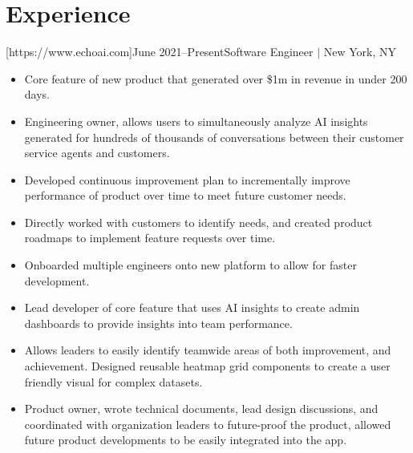 \documentclass[letterpaper,11pt]{article}
\newcommand{\Item}[1]{
  \item\small{
    \parbox[t]{500pt}{\raggedright#1}
  }
}
\newenvironment{HeadingList}{
  \begin{mdframed}[
    topline=false,
    bottomline=false,
    rightline=false,
    leftline=false,
    linecolor=gray,
    linewidth=0pt,
    leftmargin=0pt,
    innerleftmargin=0pt,
    innertopmargin=0pt,
    innerbottommargin=0pt,
    innerrightmargin=0pt,
    skipabove=\parsep,
    skipbelow=\parsep,
  ]
  \begin{itemize}[leftmargin=0pt, label={}]
}{
  \end{itemize}
  \end{mdframed}
}
\newenvironment{SubHeadingList}{
  \begin{mdframed}[
    leftline=true,
    linecolor=gray,
    linewidth=.5pt,
    leftmargin=8pt,
    innerleftmargin=8pt,
  ]
  \begin{itemize}[leftmargin=0pt, label={}]
}{
  \end{itemize}
  \end{mdframed}
}
\newenvironment{ItemList}{
  \begin{itemize}[itemsep=4pt, topsep=-3pt, partopsep=0pt, parsep=0pt, leftmargin=20pt, label=\raisebox{0.4ex}{\scalebox{0.5}{\textbullet}}]
}{\end{itemize}}
\begin{document}



\section{Experience}
    \begin{HeadingList}
        [https://www.echoai.com]{June 2021--Present}{Software Engineer $|$ New York, NY}
            \begin{SubHeadingList}

                \begin{ItemList}
                    \Item{Core feature of new product that generated over \$1m in revenue in under 200 days.}
                    \Item{Engineering owner, allows users to simultaneously analyze AI insights generated for hundreds of thousands of conversations between their customer service agents and customers.}
                    \Item{Developed continuous improvement plan to incrementally improve performance of product over time to meet future customer needs.}
                    \Item{Directly worked with customers to identify needs, and created product roadmaps to implement feature requests over time.}
                    \Item{Onboarded multiple engineers onto new platform to allow for faster development.}
                \end{ItemList}

                \begin{ItemList}
                    \Item{Lead developer of core feature that uses AI insights to create admin dashboards to provide insights into team performance.}
                    \Item{Allows leaders to easily identify teamwide areas of both improvement, and achievement. Designed reusable heatmap grid components to create a user friendly visual for complex datasets.}
                    \Item{Product owner, wrote technical documents, lead design discussions, and coordinated with organization leaders to future-proof the product, allowed future product developments to be easily integrated into the app.}
                \end{ItemList}


\end{SubHeadingList}
\end{HeadingList}
\end{document}
